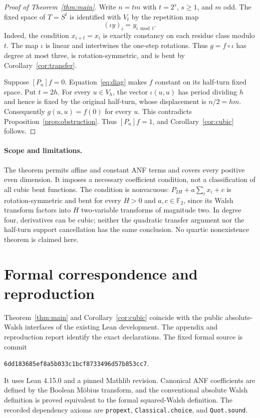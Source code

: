 \documentclass[11pt,a4paper]{article}
\newcommand{\F}{\mathbb F_2}
\begin{document}
\begin{proof}[Proof of Theorem~\ref{thm:main}]
Write $n=tm$ with $t=2^s$, $s\ge1$, and $m$ odd. The fixed space of $T=S^t$ is identified with $V_t$ by the repetition map
\[
 (\iota y)_i=y_{i\bmod t}.
\]
Indeed, the condition $x_{i+t}=x_i$ is exactly constancy on each residue class modulo $t$. The map $\iota$ is linear and intertwines the one-step rotations. Thus $g=f\circ\iota$ has degree at most three, is rotation-symmetric, and is bent by Corollary~\ref{cor:transfer}.

Suppose $[P_n]f=0$. Equation~\eqref{eq:diag} makes $f$ constant on its half-turn fixed space. Put $t=2h$. For every $u\in V_h$, the vector $\iota(u,u)$ has period dividing $h$ and hence is fixed by the original half-turn, whose displacement is $n/2=hm$. Consequently $g(u,u)=f(0)$ for every $u$. This contradicts Proposition~\ref{prop:obstruction}. Thus $[P_n]f=1$, and Corollary~\ref{cor:cubic} follows.
\end{proof}

\paragraph{Scope and limitations.}
The theorem permits affine and constant ANF terms and covers every positive even dimension. It imposes a necessary coefficient condition, not a classification of all cubic bent functions. The condition is nonvacuous: $P_{2H}+a\sum_i x_i+c$ is rotation-symmetric and bent for every $H>0$ and $a,c\in\F$, since its Walsh transform factors into $H$ two-variable transforms of magnitude two. In degree four, derivatives can be cubic; neither the quadratic transfer argument nor the half-turn support cancellation has the same conclusion. No quartic nonexistence theorem is claimed here.

\section{Formal correspondence and reproduction}
Theorem~\ref{thm:main} and Corollary~\ref{cor:cubic} coincide with the public absolute-Walsh interfaces of the existing Lean development. The appendix and reproduction report identify the exact declarations. The fixed formal source is commit
\begin{center}\small\texttt{6dd183685ef8a5b033c1bcf8733496d57b853cc7}.\end{center}
It uses Lean 4.15.0 and a pinned Mathlib revision. Canonical ANF coefficients are defined by the Boolean M\"obius transform, and the conventional absolute Walsh definition is proved equivalent to the formal squared-Walsh definition. The recorded dependency axioms are \texttt{propext}, \texttt{Classical.choice}, and \texttt{Quot.sound}.
\end{document}
